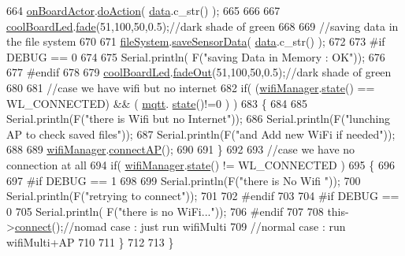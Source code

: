 \begin{DoxyCode}
664     \hyperlink{class_cool_board_a4ac693895c21025b8808653f2a4316e6}{onBoardActor}.\hyperlink{class_cool_board_actor_a96a45658d32c6b95caa2f385c7da32cd}{doAction}( \hyperlink{class_cool_board_a427fb753dd8575bdf821c70a5c63d695}{data}.c\_str() );  
665 
666 
667     \hyperlink{class_cool_board_a1b1d3c684a5baa56b08486e192fd8e97}{coolBoardLed}.\hyperlink{class_cool_board_led_af1cacbaa88db8bcf6042c1083ba41155}{fade}(51,100,50,0.5);\textcolor{comment}{//dark shade of green  }
668     
669     \textcolor{comment}{//saving data in the file system}
670     
671     \hyperlink{class_cool_board_a42c2586fbb13ff7f06538e9284e8538d}{fileSystem}.\hyperlink{class_cool_file_system_afa3a4feae94871d4d3b6bebb701c2e67}{saveSensorData}( \hyperlink{class_cool_board_a427fb753dd8575bdf821c70a5c63d695}{data}.c\_str() );
672 
673 \textcolor{preprocessor}{    #if DEBUG == 0}
674 
675         Serial.println( F(\textcolor{stringliteral}{"saving Data in Memory : OK"}));
676 
677 \textcolor{preprocessor}{    #endif}
678 
679     \hyperlink{class_cool_board_a1b1d3c684a5baa56b08486e192fd8e97}{coolBoardLed}.\hyperlink{class_cool_board_led_a93d545679237e8cc858324367149775c}{fadeOut}(51,100,50,0.5);\textcolor{comment}{//dark shade of green}
680 
681     \textcolor{comment}{//case we have wifi but no internet}
682     \textcolor{keywordflow}{if}( (\hyperlink{class_cool_board_acd88e6003606b47479ebba81e4aceeca}{wifiManager}.\hyperlink{class_cool_wifi_a1c7b4d82a4098d346e7593dce92039fa}{state}() == WL\_CONNECTED) && ( \hyperlink{class_cool_board_a2399f44d7c23c1149a335cb3b46d90f1}{mqtt}.
      \hyperlink{class_cool_m_q_t_t_a5d003307eff78efbd585e42b43b72b6d}{state}()!=0 ) )
683     \{
684         
685         Serial.println(F(\textcolor{stringliteral}{"there is Wifi but no Internet"}));
686         Serial.println(F(\textcolor{stringliteral}{"lunching AP to check saved files"}));
687         Serial.println(F(\textcolor{stringliteral}{"and Add new WiFi if needed"}));
688         
689         \hyperlink{class_cool_board_acd88e6003606b47479ebba81e4aceeca}{wifiManager}.\hyperlink{class_cool_wifi_a7c857f27161782f5ef1d62d552aff971}{connectAP}();
690         
691     \}
692     
693     \textcolor{comment}{//case we have no connection at all}
694     \textcolor{keywordflow}{if}( \hyperlink{class_cool_board_acd88e6003606b47479ebba81e4aceeca}{wifiManager}.\hyperlink{class_cool_wifi_a1c7b4d82a4098d346e7593dce92039fa}{state}() != WL\_CONNECTED )
695     \{
696     
697 \textcolor{preprocessor}{    #if DEBUG == 1}
698         
699         Serial.println(F(\textcolor{stringliteral}{"there is No Wifi "}));
700         Serial.println(F(\textcolor{stringliteral}{"retrying to connect"}));
701     
702 \textcolor{preprocessor}{    #endif}
703 
704 \textcolor{preprocessor}{    #if DEBUG == 0}
705         Serial.println( F(\textcolor{stringliteral}{"there is no WiFi..."}));
706 \textcolor{preprocessor}{    #endif}
707         
708         this->\hyperlink{class_cool_board_a519de78b807f8ec6463ff484eb925918}{connect}();\textcolor{comment}{//nomad case : just run wifiMulti}
709                 \textcolor{comment}{//normal case : run wifiMulti+AP}
710         
711     \}   
712 
713 \}
\end{DoxyCode}
